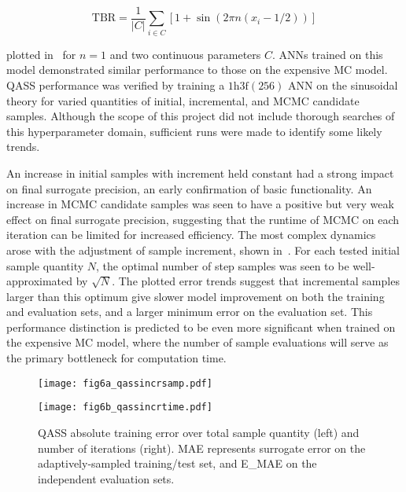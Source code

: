 \begin{equation}
	\text{TBR} = \frac{1}{|C|}\sum_{i \in C} \left[1 + \sin(2\pi n (x_i - 1/2)) \right]
\end{equation}

plotted in~ for $n=1$ and two continuous parameters $C$.
ANNs trained on this model demonstrated similar performance to those on the expensive
MC model. QASS performance was verified by training a $\text{1h3f}(256)$ ANN on
the sinusoidal theory for varied quantities of initial, incremental, and MCMC
candidate samples. Although the scope of this project did not include thorough
searches of this hyperparameter domain, sufficient runs were made to identify
some likely trends.

An increase in initial samples with increment held constant had a strong impact
on final surrogate precision, an early confirmation of basic functionality. An
increase in MCMC candidate samples was seen to have a positive but very weak
effect on final surrogate precision, suggesting that the runtime of MCMC on each
iteration can be limited for increased efficiency. The most complex dynamics
arose with the adjustment of sample increment, shown in~. For
each tested initial sample quantity $N$, the optimal number of step samples was seen to be well-approximated by $\sqrt{N}$. The plotted error trends suggest that
incremental samples larger than this optimum give slower model improvement on both the training and evaluation sets, and a larger minimum error on the evaluation set. This performance distinction is predicted to be even more significant when trained on the expensive MC model, where the number of sample evaluations will serve as the primary bottleneck for computation time.
\begin{figure}[h!]
    \centering
    \begin{minipage}{0.5\textwidth}
        \centering
        \texttt{[image: fig6a\_qassincrsamp.pdf]}
    \end{minipage}%
    \hfill%
    \begin{minipage}{0.5\textwidth}
        \centering
        \texttt{[image: fig6b\_qassincrtime.pdf]}
    \end{minipage}
    \caption{QASS absolute training error over total sample quantity (left) and number of iterations (right). MAE represents surrogate error on the adaptively-sampled training/test set, and E\_MAE on the independent evaluation sets.}
    \label{fig:qassincr}
\end{figure}

